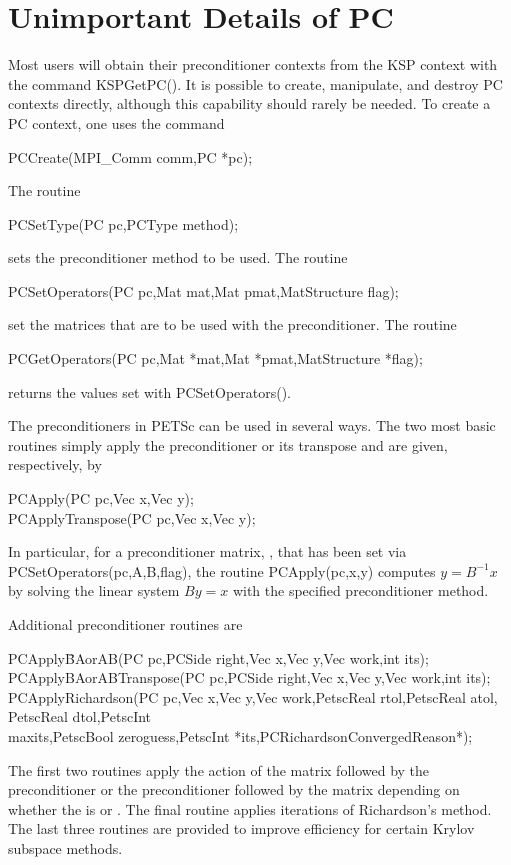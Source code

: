 {{{\section{Unimportant Details of PC}

Most users will obtain their preconditioner contexts from the KSP
context with the command KSPGetPC(). It is possible to create,
manipulate, and destroy PC contexts directly, although this capability
should rarely be needed. To create a PC context, one uses the command
\begin{tabbing}
  PCCreate(MPI\_Comm comm,PC *pc);
\end{tabbing}
The routine 
\begin{tabbing}
  PCSetType(PC pc,PCType method);
\end{tabbing}
sets the preconditioner method to be used. 
The routine 
\begin{tabbing}
  PCSetOperators(PC pc,Mat mat,Mat pmat,MatStructure flag);\\
\end{tabbing}
set the matrices that are to be used with 
the preconditioner.  
The routine 
\begin{tabbing}
  PCGetOperators(PC pc,Mat *mat,Mat *pmat,MatStructure *flag);
\end{tabbing}
returns the values set with PCSetOperators().

The preconditioners in PETSc can be used in several ways.  The two
most basic routines simply apply the preconditioner or its transpose
and are given, respectively, by
\begin{tabbing}
  PCApply(PC pc,Vec x,Vec y);\\
  PCApplyTranspose(PC pc,Vec x,Vec y);
\end{tabbing}
In particular, for a preconditioner matrix, , that has
been set via PCSetOperators(pc,A,B,flag),
the routine PCApply(pc,x,y) computes $y = B^{-1} x$
by solving the linear system $By = x$ with the specified preconditioner
method.

Additional preconditioner routines are
\begin{tabbing}
  PCApply\=BAorAB(PC pc,PCSide right,Vec x,Vec y,Vec work,int its);\\
  PCApplyBAorABTranspose(PC pc,PCSide right,Vec x,Vec y,Vec work,int its);\\
  PCApplyRichardson(PC pc,Vec x,Vec y,Vec work,PetscReal rtol,PetscReal atol, PetscReal dtol,PetscInt \\
   \>  maxits,PetscBool  zeroguess,PetscInt *its,PCRichardsonConvergedReason*);
\end{tabbing}
The first two routines apply the action of the matrix followed by the
preconditioner or the preconditioner followed by the matrix depending
on whether the   is
 or . The final routine applies  iterations of
Richardson's method.   
The last three routines are provided to improve
efficiency for certain Krylov subspace methods.

}}}
